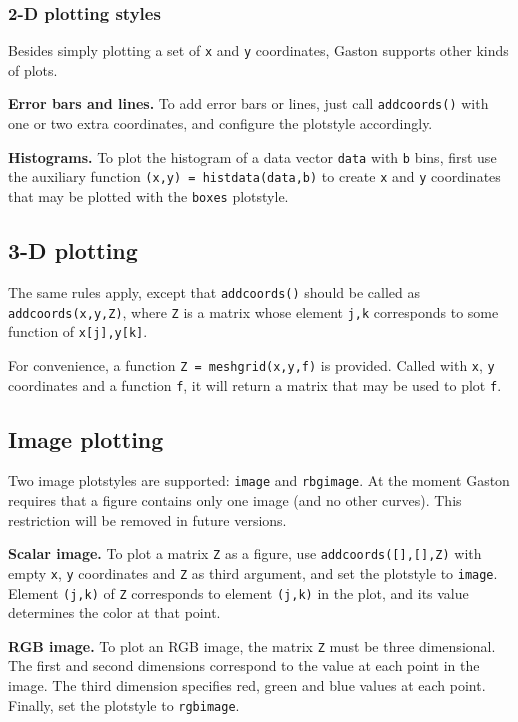 \documentclass[11pt]{article}
\newcommand{\cmd}[1]{\texttt{#1}}
\begin{document}
\subsubsection{2-D plotting styles}

Besides simply plotting a set of \cmd{x} and \cmd{y} coordinates, Gaston
supports other kinds of plots.

\textbf{Error bars and lines.} To add error bars or lines, just call
\cmd{addcoords()} with one or two extra coordinates, and configure the
plotstyle accordingly.

\textbf{Histograms.} To plot the histogram of a data vector \cmd{data} with
\cmd{b} bins, first use the auxiliary function \cmd{(x,y) = histdata(data,b)}
to create \cmd{x} and \cmd{y} coordinates that may be plotted with the
\cmd{boxes} plotstyle.

\subsection{3-D plotting}

The same rules apply, except that \cmd{addcoords()} should be called as
\cmd{addcoords(x,y,Z)}, where \cmd{Z} is a matrix whose element \cmd{j,k}
corresponds to some function of \cmd{x[j],y[k]}.

For convenience, a function \cmd{Z = meshgrid(x,y,f)} is provided. Called with
\cmd{x}, \cmd{y} coordinates and a function \cmd{f}, it will return a matrix
that may be used to plot \cmd{f}.

\subsection{Image plotting}

Two image plotstyles are supported: \cmd{image} and \cmd{rbgimage}. At the
moment Gaston requires that a figure contains only one image (and no other
curves). This restriction will be removed in future versions.

\textbf{Scalar image.} To plot a matrix \cmd{Z} as a figure, use
\cmd{addcoords([],[],Z)} with empty \cmd{x}, \cmd{y} coordinates and \cmd{Z} as
third argument, and set the plotstyle to \cmd{image}. Element \cmd{(j,k)} of
\cmd{Z} corresponds to element \cmd{(j,k)} in the plot, and its value determines
the color at that point.

\textbf{RGB image.} To plot an RGB image, the matrix \cmd{Z} must be three
dimensional. The first and second dimensions correspond to the value at each
point in the image.  The third dimension specifies red, green and blue values
at each point.  Finally, set the plotstyle to \cmd{rgbimage}.
\end{document}
